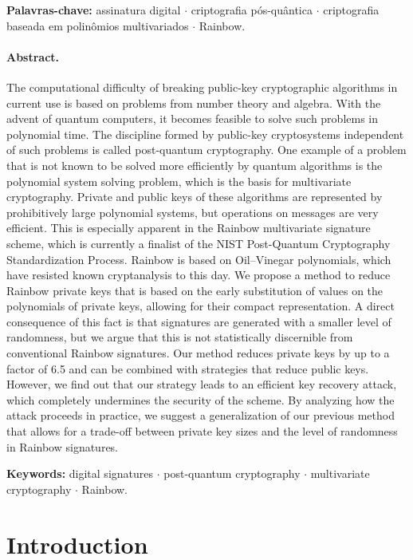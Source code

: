\documentclass[12pt, a4paper, oneside]{memoir}
\theoremstyle{definition}
\begin{document}
\textbf{Palavras-chave:} assinatura digital $\cdot$ criptografia pós-quântica $\cdot$ criptografia baseada em polinômios multivariados $\cdot$ Rainbow.

\subsubsection{Abstract.}

The computational difficulty of breaking public-key cryptographic algorithms in current use is based on problems from number theory and algebra. With the advent of quantum computers, it becomes feasible to solve such problems in polynomial time. The discipline formed by public-key cryptosystems independent of such problems is called post-quantum cryptography. One example of a problem that is not known to be solved more efficiently by quantum algorithms is the polynomial system solving problem, which is the basis for multivariate cryptography. Private and public keys of these algorithms are represented by prohibitively large polynomial systems, but operations on messages are very efficient. This is especially apparent in the Rainbow multivariate signature scheme, which is currently a finalist of the NIST Post-Quantum Cryptography Standardization Process. Rainbow is based on Oil--Vinegar polynomials, which have resisted known cryptanalysis to this day. We propose a method to reduce Rainbow private keys that is based on the early substitution of values on the polynomials of private keys, allowing for their compact representation. A direct consequence of this fact is that signatures are generated with a smaller level of randomness, but we argue that this is not statistically discernible from conventional Rainbow signatures. Our method reduces private keys by up to a factor of 6.5 and can be combined with strategies that reduce public keys. However, we find out that our strategy leads to an efficient key recovery attack, which completely undermines the security of the scheme. By analyzing how the attack proceeds in practice, we suggest a generalization of our previous method that allows for a trade-off between private key sizes and the level of randomness in Rainbow signatures.

\textbf{Keywords:} digital signatures $\cdot$ post-quantum cryptography $\cdot$ multivariate cryptography $\cdot$ Rainbow.

\newpage
\tableofcontents*

\chapter{Introduction}\label{ch:intro}
\end{document}
